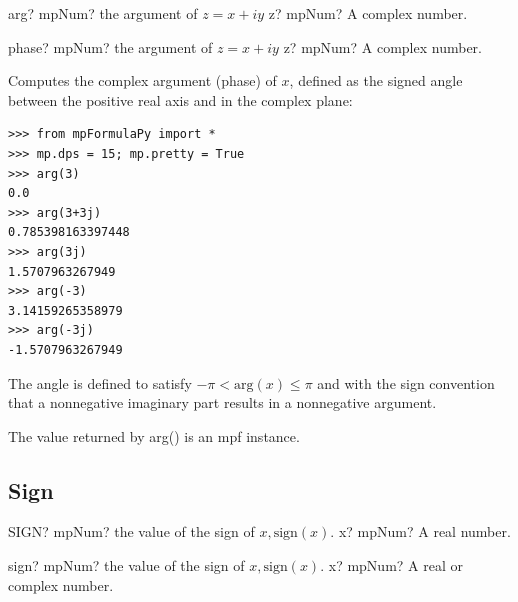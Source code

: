 \vspace{0.6cm}

\begin{mpFunctionsExtract}
	\mpFunctionOne
	{arg? mpNum? the argument of $z=x+iy$}
	{z? mpNum? A complex number.}
\end{mpFunctionsExtract}

\vspace{0.6cm}

\begin{mpFunctionsExtract}
	\mpFunctionOne
	{phase? mpNum? the argument of $z=x+iy$}
	{z? mpNum? A complex number.}
\end{mpFunctionsExtract}


\vpara
Computes the complex argument (phase) of $x$, defined as the signed angle between the positive real axis and in the complex plane:

\begin{lstlisting}
>>> from mpFormulaPy import *
>>> mp.dps = 15; mp.pretty = True
>>> arg(3)
0.0
>>> arg(3+3j)
0.785398163397448
>>> arg(3j)
1.5707963267949
>>> arg(-3)
3.14159265358979
>>> arg(-3j)
-1.5707963267949
\end{lstlisting}


The angle is defined to satisfy $-\pi < \text{arg}(x) \leq \pi$ and with the sign convention that a nonnegative imaginary part results in a nonnegative argument.

\vpara
The value returned by arg() is an mpf instance.





\subsection{Sign}



\begin{mpFunctionsExtract}
	\mpWorksheetFunctionOneNotImplemented
	{SIGN? mpNum? the value of the sign of $x, \text{sign}(x)$.}
	{x? mpNum? A real number.}
\end{mpFunctionsExtract}

\vspace{0.6cm}

\begin{mpFunctionsExtract}
	\mpFunctionOne
	{sign? mpNum? the value of the sign of $x, \text{sign}(x)$.}
	{x? mpNum? A real or complex number.}
\end{mpFunctionsExtract}



